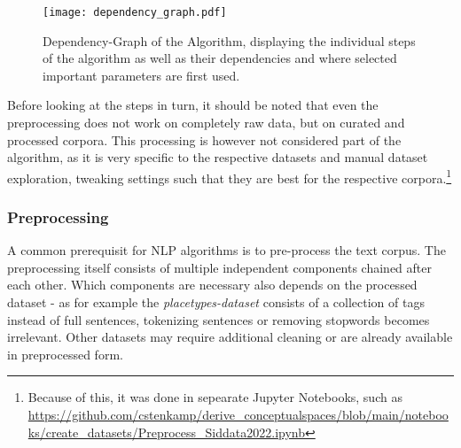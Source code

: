 \begin{figure}[htp]
	\begin{center}
	  \texttt{[image: dependency\_graph.pdf]}
	  \caption[Dependency-Graph of the Algorithm]{Dependency-Graph of the Algorithm, displaying the individual steps of the algorithm as well as their dependencies and where selected important parameters are first used. }
	  \label{fig:dependency_graph}
	\end{center}
\end{figure}




Before looking at the steps in turn, it should be noted that even the preprocessing does not work on completely raw data, but on curated and processed corpora. This processing is however not considered part of the algorithm, as it is very specific to the respective datasets and manual dataset exploration, tweaking settings such that they are best for the respective corpora.\footnote{Because of this, it was done in sepearate Jupyter Notebooks, such as \url{https://github.com/cstenkamp/derive_conceptualspaces/blob/main/notebooks/create_datasets/Preprocess_Siddata2022.ipynb} } %

\subsubsection{Preprocessing}

\label{sec:algo_preproc}


A common prerequisit for NLP algorithms is to pre-process the text corpus. The preprocessing itself consists of multiple independent components chained after each other. Which components are necessary also depends on the processed dataset - as for example the \emph{placetypes-dataset} consists of a collection of tags instead of full sentences, tokenizing sentences or removing \glspl{stopword} becomes irrelevant. Other datasets may require additional cleaning or are already available in preprocessed form.

